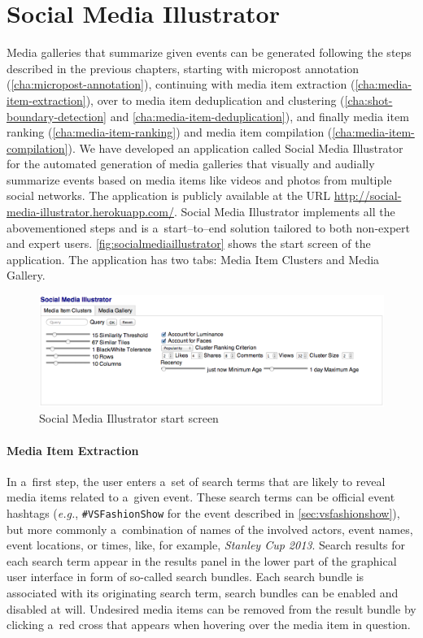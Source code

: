 \section{Social Media Illustrator}
\label{sec:socialmediaillustrator}

Media galleries that summarize given events
can be generated following the steps described in the previous chapters,
starting with micropost annotation (\autoref{cha:micropost-annotation}), continuing with media item extraction
(\autoref{cha:media-item-extraction}),
over to media item deduplication and clustering
(\autoref{cha:shot-boundary-detection} and  
\autoref{cha:media-item-deduplication}), and finally
media item ranking (\autoref{cha:media-item-ranking}) and
media item compilation (\autoref{cha:media-item-compilation}).
We have developed an application called Social Media Illustrator
for the automated generation of
media galleries that visually and audially summarize events
based on media items like videos and photos from multiple social networks.
The application is publicly available at the URL 
\url{http://social-media-illustrator.herokuapp.com/}.
Social Media Illustrator implements all the abovementioned steps
and is a~start--to--end solution tailored to both
non-expert and expert users.
\autoref{fig:socialmediaillustrator}
shows the start screen of the application.
The application has two tabs: Media Item Clusters and Media Gallery.

\begin{figure}[htb]
  \centering
  \includegraphics[width=1\columnwidth]{socialmediaillustrator.png}
  \caption{Social Media Illustrator start screen}
  \label{fig:socialmediaillustrator}
\end{figure}

\paragraph{Media Item Extraction}

In a~first step, the user enters a~set of search terms
that are likely to reveal media items related to a~given event.
These search terms can be official event hashtags
(\emph{e.g.}, \texttt{\#VSFashionShow}
for the event described in \autoref{sec:vsfashionshow}),
but more commonly a~combination of names of the involved actors,
event names, event locations, or times, like, for example, \emph{Stanley Cup 2013}.
Search results for each search term appear in the results panel
in the lower part of the graphical user interface
in form of so-called search bundles.
Each search bundle is associated with its originating search term,
search bundles can be enabled and disabled at will.
Undesired media items can be removed from the result bundle
by clicking a~red cross that appears
when hovering over the media item in question.

